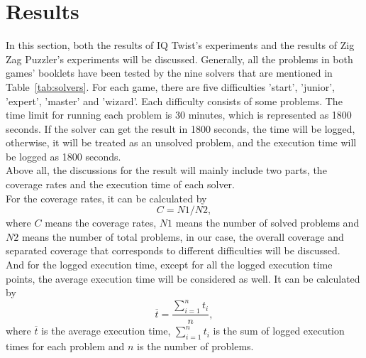\section{Results}
\label{sec:Result}
In this section, both the results of IQ Twist's experiments and the results of Zig Zag Puzzler's experiments will be discussed. Generally, all the problems in both games' booklets have been tested by the nine solvers that are mentioned in Table~\ref{tab:solvers}. For each game, there are five difficulties 'start', 'junior', 'expert', 'master' and 'wizard'. Each difficulty consists of some problems. The time limit for running each problem is 30 minutes, which is represented as 1800 seconds. If the solver can get the result in 1800 seconds, the time will be logged, otherwise, it will be treated as an unsolved problem, and the execution time will be logged as 1800 seconds. 
\\Above all, the discussions for the result will mainly include two parts, the coverage rates and the execution time of each solver. 
\\For the coverage rates, it can be calculated by 
\begin{equation}
\label{equation:coverage}
   C= N1/N2,
\end{equation}
where $C$ means the coverage rates, $N1$ means the number of solved problems and $N2$ means the number of total problems, in our case, the overall coverage and separated coverage that corresponds to different difficulties will be discussed.
\\And for the logged execution time, except for all the logged execution time points, the average execution time will be considered as well. It can be calculated by 
\begin{equation}
\label{equation:averagetime}
\overline{t}=\frac{\sum\limits_{i=1}^n t_{i}}{n},
\end{equation}
where $\overline{t}$ is the average execution time, $\sum\limits_{i=1}^n t_{i}$ is the sum of logged execution times for each problem and $n$ is the number of problems.
